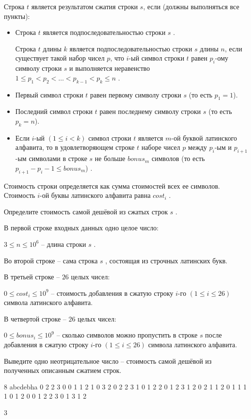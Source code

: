 
Строка $t$ является результатом сжатия строки $s$, если (должны выполняться все пункты):

\begin{itemize}
\item Строка $t$ является подпоследовательностью строки $s$ .

Строка $t$ длины $k$ является подпоследовательностью строки $s$ длины $n$, если существует такой набор чисел $p$, что $i$-ый символ строки $t$ равен $p_i$-ому символу строки $s$ и выполняется неравенство $1 \le p_{1} < p_{2} < \ldots < p_{k-1} < p_{k} \le n$ .


\item Первый символ строки $t$ равен первому символу строки $s$ (то есть $p_{1} = 1$).
\item Последний символ строки $t$ равен последнему символу строки $s$ (то есть $p_{k} = n$).
\item Если $i$-ый $(1 \le i < k)$ символ строки $t$ является $m$-ой буквой латинского алфавита, то в удовлетворяющем строке $t$ наборе чисел $p$ между $p_i$-ым и $p_{i+1}$-ым символами в строке $s$ не больше $bonus_m$ символов (то есть $p_{i+1}-p_{i} - 1 \le bonus_m$) .
\end{itemize}


Стоимость строки определяется как сумма стоимостей всех ее символов. Стоимость $i$-ой буквы латинского алфавита равна $cost_{i}$ .

Определите стоимость самой дешёвой из сжатых строк $s$ .


В первой строке входных данных одно целое число:

$3 \le n \le 10^{6}$ -- длина строки $s$ .

Во второй строке -- сама строка $s$ , состоящая из строчных латинских букв.

В третьей строке -- $26$ целых чисел:

$0 \le cost_{i} \le 10^{9}$ -- стоимость добавления в сжатую строку $i$-го $(1 \le i \le 26)$ символа латинского алфавита.

В четвертой строке -- $26$ целых чисел:

$0 \le bonus_{i} \le 10^{9}$ -- сколько символов можно пропустить в строке $s$ после добавления в сжатую строку $i$-го $(1 \le i \le 26)$ символа латинского алфавита.

\outputfmtSection

Выведите одно неотрицательное число -- стоимость самой дешёвой из полученных описанным сжатием строк.

\exampleSection


\begin{myverbbox}[\small]{\vinput}
8
abcdebha
0 2 2 3 0 0 1 1 2 1 0 3 2 0 2 2 3 1 0 1 2 2 0 1 2 3
1 2 0 2 1 1 2 0 1 1 1 1 0 1 2 0 0 1 2 2 3 0 1 3 1 2
\end{myverbbox}
\begin{myverbbox}[\small]{\voutput}
3
\end{myverbbox}


